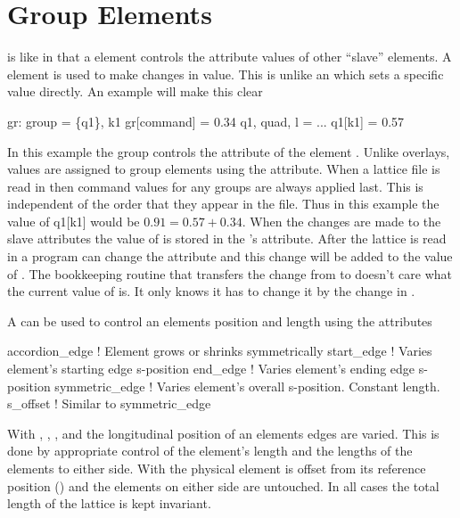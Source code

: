 \section{Group Elements}
\label{s:group}
 
 is like  in that a  element controls
the attribute values of other ``slave'' elements. A 
element is used to make changes in value. This is unlike an
 which sets a specific value directly. An example will
make this clear
\begin{example}
  gr: group = \{q1\}, k1 
  gr[command] = 0.34 
  q1, quad, l = ...
  q1[k1] = 0.57
\end{example}
In this example the group  controls the  attribute of
the element . Unlike overlays, values are assigned to group
elements using the  attribute. When a lattice file is
read in then command values for any groups are always applied
last. This is independent of the order that they appear in the file.
Thus in this example the value of q1[k1] would be $0.91 = 0.57 + 0.34$.
When the changes are made to the slave attributes the value of
 is stored in the 's  attribute.
After the lattice is read in a program can change the 
attribute and this change will be added to the value of
. The bookkeeping routine that transfers the change from
 to  doesn't care what the current value of
 is. It only knows it has to change it by the change in
.

A  can be used to control an elements position and length
using the attributes
\begin{example}
  accordion_edge  ! Element grows or shrinks symmetrically
  start_edge      ! Varies element's starting edge s-position
  end_edge        ! Varies element's ending edge s-position
  symmetric_edge  ! Varies element's overall s-position. Constant length.
  s_offset        ! Similar to symmetric_edge
\end{example}
With , , , and
 the longitudinal position of an elements edges are
varied. This is done by appropriate control of the element's length
and the lengths of the elements to either side. With  the
physical element is offset from its reference position
() and the elements on either side are untouched.
In all cases the total length of the lattice is kept invariant.

